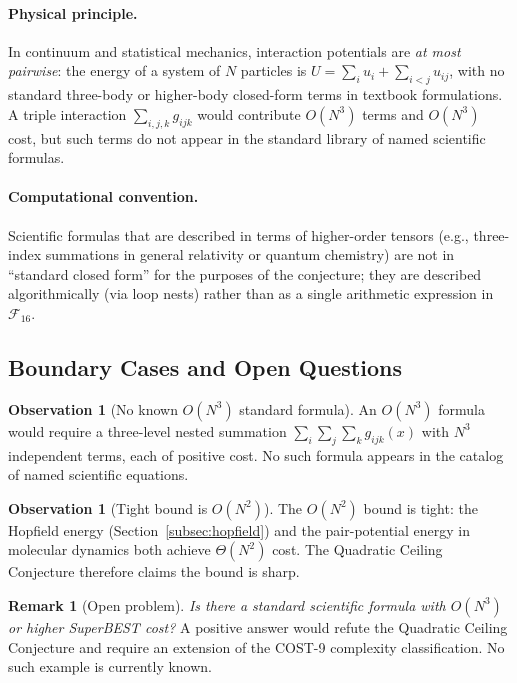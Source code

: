 \documentclass[12pt,a4paper]{article}
\theoremstyle{definition}
\newtheorem{remark}[theorem]{Remark}
\newtheorem{observation}[theorem]{Observation}
\begin{document}
\paragraph{Physical principle.}
In continuum and statistical mechanics, interaction potentials are
\emph{at most pairwise}: the energy of a system of $N$ particles is
$U = \sum_i u_i + \sum_{i<j} u_{ij}$, with no standard three-body or
higher-body closed-form terms in textbook formulations.  A triple interaction
$\sum_{i,j,k} g_{ijk}$ would contribute $O(N^3)$ terms and $O(N^3)$ cost, but
such terms do not appear in the standard library of named scientific formulas.

\paragraph{Computational convention.}
Scientific formulas that are described in terms of higher-order tensors
(e.g., three-index summations in general relativity or quantum chemistry) are
not in ``standard closed form'' for the purposes of the conjecture; they are
described algorithmically (via loop nests) rather than as a single arithmetic
expression in $\mathcal{F}_{16}$.

\subsection{Boundary Cases and Open Questions}

\begin{observation}[No known $O(N^3)$ standard formula]
\label{obs:nocubic}
An $O(N^3)$ formula would require a three-level nested summation
$\sum_i \sum_j \sum_k g_{ijk}(x)$ with $N^3$ independent terms, each of
positive cost.  No such formula appears in the catalog of named scientific
equations.
\end{observation}

\begin{observation}[Tight bound is $O(N^2)$]
\label{obs:tight}
The $O(N^2)$ bound is tight: the Hopfield energy (Section~\ref{subsec:hopfield})
and the pair-potential energy in molecular dynamics both achieve $\Theta(N^2)$
cost.  The Quadratic Ceiling Conjecture therefore claims the bound is sharp.
\end{observation}

\begin{remark}[Open problem]
\label{rem:openq}
\textit{Is there a standard scientific formula with $O(N^3)$ or higher
SuperBEST cost?}  A positive answer would refute the Quadratic Ceiling
Conjecture and require an extension of the COST-9 complexity classification.
No such example is currently known.
\end{remark}
\end{document}

